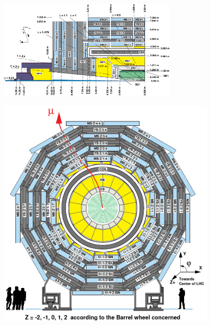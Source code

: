 \begin{figure}
\centering
\includegraphics[width=0.80\textwidth]{CMS/CMSLONG.png}
\label{CMS1}
\end{figure}


\begin{figure}[p]
\centering
\includegraphics[width=0.98\textwidth]{CMS/CMSTRANS.png}
\label{CMS2}
\end{figure}

